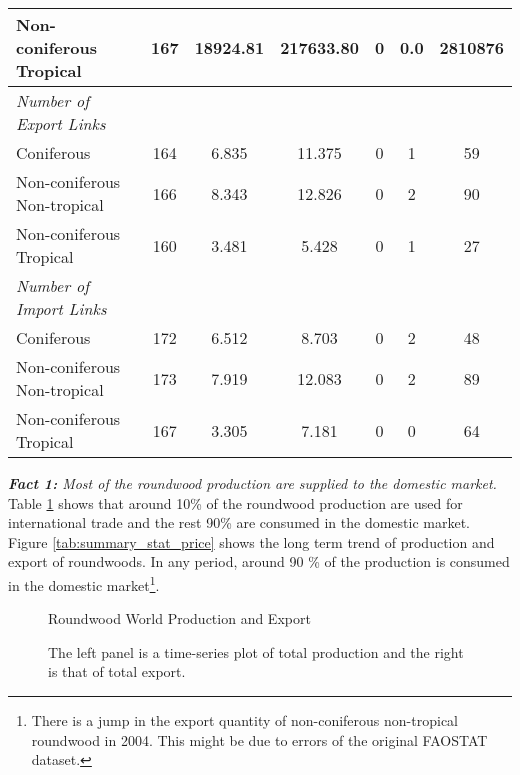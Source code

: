 \documentclass[a4paper,12pt]{article}
\begin{document}
\begin{table}[htbp]
\begin{tabular}{lcccccc}
Non-coniferous Tropical & 167 & 18924.81 & 217633.80 & 0 & 0.0 & 2810876\\

\midrule
\emph{Number of Export Links}\\
Coniferous & 164 & 6.835 & 11.375 & 0 & 1 & 59\\

Non-coniferous Non-tropical & 166 & 8.343 & 12.826 & 0 & 2 & 90\\

Non-coniferous Tropical & 160 & 3.481 & 5.428 & 0 & 1 & 27\\
\midrule
\emph{Number of Import Links}\\
Coniferous & 172 & 6.512 & 8.703 & 0 & 2 & 48\\

Non-coniferous Non-tropical & 173 & 7.919 & 12.083 & 0 & 2 & 89\\
Non-coniferous Tropical & 167 & 3.305 & 7.181 & 0 & 0 & 64\\
\midrule \midrule
        \end{tabular}
        \label{tab:summary_stat}
 \end{table}


\textit{\textbf{Fact 1:} Most of the roundwood production are supplied to the domestic market.} \\
Table \ref{tab:summary_stat} shows that around 10\% of the roundwood production are used for international trade and the rest 90\% are consumed in the domestic market. Figure \ref{tab:summary_stat_price} shows the long term trend of production and export of roundwoods. In any period, around 90 \% of the production is consumed in the domestic market\footnote{There is a jump in the export quantity of non-coniferous non-tropical roundwood in 2004. This might be due to errors of the original FAOSTAT dataset.}.

\begin{figure}[htbp]
    \centering
    \caption{Roundwood World Production and Export}
    \caption*{\small{The left panel is a time-series plot of total production and the right is that of total export.}}
    \label{fig:time_series_prod_exp}
\end{figure}
\end{document}
